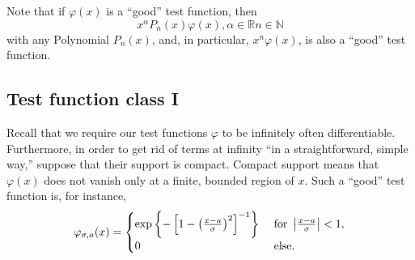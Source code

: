 Note that if $\varphi (x)$ is a ``good'' test function, then
\begin{equation}
x^\alpha P_n (x)\varphi (x), \alpha \in \mathbb{R} n \in \mathbb{N}
\end{equation}
with any Polynomial $P_n (x)$, and, in particular, $x^n\varphi (x)  $, is also
 a ``good'' test function.

\subsection{Test function class I}

Recall that we require\cite{schwartz} our test functions $\varphi$
to be infinitely often differentiable. Furthermore, in order to get rid of terms at infinity ``in a straightforward, simple way,''
suppose that their support is compact.
Compact support means that $\varphi (x)$ does not vanish only at a finite, bounded region of $x$.
Such a ``good'' test function is, for instance,
\begin{equation}
\varphi_{\sigma ,a}(x)
=
\begin{cases}
\exp \left\{ -\left[ 1 - \left( \frac{x-a}{\sigma }\right)^2 \right]^{-1} \right\} & \textrm{ for } \left\vert  {x-a\over \sigma }\right\vert <1, \\
                                0 & \textrm{ else.}
\end{cases}
\label{2018-m-ch-di-tf1}
\end{equation}

